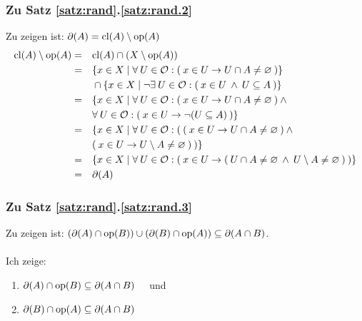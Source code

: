 \subsubsection{Zu Satz \ref{satz:rand}.\ref{satz:rand.2}}\label{anh:rand.2}
    Zu zeigen ist: $\partial(A) = \text{cl}(A) \setminus \text{op}(A)$
    \begin{align*}
    \text{cl}(A) \setminus \text{op}(A) &= &&\text{cl}(A) \cap (X \setminus \text{op}(A))\\
                            &= &&\{x \in X \mid \forall\: U \in \mathcal{O}: (\: x \in U \to U \cap A \neq \varnothing \:)\}\\ 
                            &  &&\cap \{x \in X \mid \neg \exists\: U \in \mathcal{O}: (\: x \in U \:\land\: U \subseteq A\:)\}\\
                            &= &&\{x \in X \mid \forall\: U \in \mathcal{O}: (\: x \in U \to U \cap A \neq \varnothing\:) \:\land\:\\ 
                            &  &&\forall\: U \in \mathcal{O}:(\: x \in U \to \neg(U \subseteq A) \:) \}\\
                            &= &&\{x \in X \mid \forall\: U \in \mathcal{O}: (\: (\: x \in U \to U \cap A \neq \varnothing \:) \:\land\:\\
                            &  &&(\: x \in U \to U \setminus A \neq \varnothing \:) \:) \}\\
                            &= &&\{x \in X \mid \forall\: U \in \mathcal{O}: (\: x \in U \to (\: U \cap A \neq \varnothing \:\land\: U \setminus A \neq \varnothing \:) \:) \}\\
                            &= &&\partial(A)
    \end{align*}


\subsubsection{Zu Satz \ref{satz:rand}.\ref{satz:rand.3}}\label{anh:rand.3}
    Zu zeigen ist: $(\partial(A) \cap \text{op}(B)) \cup (\partial(B) \cap \text{op}(A)) \subseteq \partial(A \cap B)$.\\ \ \\
    Ich zeige:
    \begin{enumerate}
    \item\label{anh:rand.3.1} $\partial(A) \cap \text{op}(B) \subseteq \partial(A \cap B) \quad$ und
    \item\label{anh:rand.3.2} $\partial(B) \cap \text{op}(A) \subseteq \partial(A \cap B)$
    \end{enumerate}

